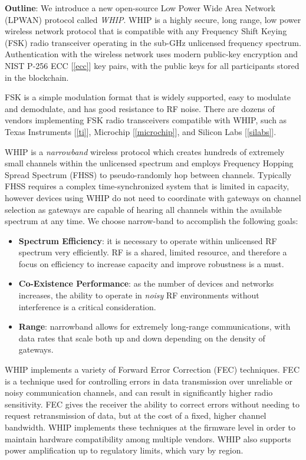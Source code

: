 \documentclass[letterpaper,11pt]{article}
\begin{document}
\textbf{Outline}: We introduce a new open-source Low Power Wide Area Network (LPWAN) protocol called \emph{WHIP}. WHIP is a highly secure, long range, low power wireless network protocol that is compatible with any Frequency Shift Keying (FSK) radio transceiver operating in the sub-GHz unlicensed frequency spectrum. Authentication with the wireless network uses modern public-key encryption and NIST P-256 ECC [\ref{ecc}] key pairs, with the public keys for all participants stored in the blockchain.

FSK is a simple modulation format that is widely supported, easy to modulate and demodulate, and has good resistance to RF noise. There are dozens of vendors implementing FSK radio transceivers compatible with WHIP, such as Texas Instruments [\ref{ti}], Microchip [\ref{microchip}], and Silicon Labs [\ref{silabs}].

WHIP is a \emph{narrowband} wireless protocol which creates hundreds of extremely small channels within the unlicensed spectrum and employs Frequency Hopping Spread Spectrum (FHSS) to pseudo-randomly hop between channels. Typically FHSS requires a complex time-synchronized system that is limited in capacity, however devices using WHIP do not need to coordinate with gateways on channel selection as gateways are capable of hearing all channels within the available spectrum at any time. We choose narrow-band to accomplish the following goals:

\begin{itemize}
    \item \textbf{Spectrum Efficiency}: it is necessary to operate within unlicensed RF spectrum very efficiently. RF is a shared, limited resource, and therefore a focus on efficiency to increase capacity and improve robustness is a must.
    \item \textbf{Co-Existence Performance}: as the number of devices and networks increases, the ability to operate in \emph{noisy} RF environments without interference is a critical consideration.
    \item \textbf{Range}: narrowband allows for extremely long-range communications, with data rates that scale both up and down depending on the density of gateways.
\end{itemize}

WHIP implements a variety of Forward Error Correction (FEC) techniques. FEC is a technique used for controlling errors in data transmission over unreliable or noisy communication channels, and can result in significantly higher radio sensitivity. FEC gives the receiver the ability to correct errors without needing to request retransmission of data, but at the cost of a fixed, higher channel bandwidth. WHIP implements these techniques at the firmware level in order to maintain hardware compatibility among multiple vendors. WHIP also supports power amplification up to regulatory limits, which vary by region.
\end{document}
